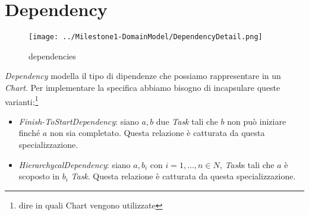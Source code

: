 \section{Dependency}
\label{sec:dependency}

\begin{figure}[h!] 
	\centering
	\texttt{[image: ../Milestone1-DomainModel/DependencyDetail.png]}
	\caption{dependencies}
	\label{fig:dependencies} 
\end{figure}

\emph{Dependency} modella il tipo di dipendenze che possiamo rappresentare in
un \emph{Chart}. Per implementare la specifica abbiamo bisogno di incapsulare
queste varianti:\footnote{dire in quali Chart vengono utilizzate}
\begin{itemize}
  \item \emph{Finish-ToStartDependency}: siano $a, b$ due \emph{Task} tali
  che $b$ non pu\`o iniziare finch\'e $a$ non sia completato. Questa relazione
  \`e catturata da questa specializzazione.
  \item \emph{HierarchycalDependency}: siano $a, b_{i}$ con $i= 1,\ldots,n \in
  N$, \emph{Task}s tali che $a$ \`e scoposto in $b_{i}$ \emph{Task}. Questa
  relazione \`e catturata da questa specializzazione.
\end{itemize}